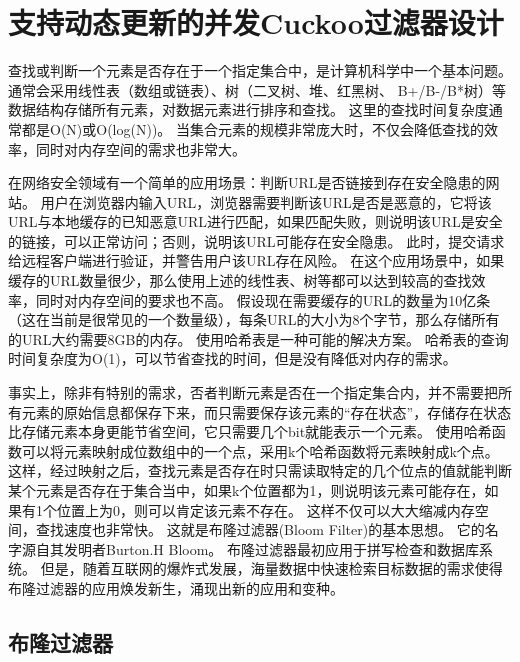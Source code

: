 \chapter{支持动态更新的并发Cuckoo过滤器设计}
查找或判断一个元素是否存在于一个指定集合中，是计算机科学中一个基本问题。
通常会采用线性表（数组或链表）、树（二叉树、堆、红黑树、 B+/B-/B*树）等数据结构存储所有元素，对数据元素进行排序和查找。
这里的查找时间复杂度通常都是O(N)或O(log(N))。
当集合元素的规模非常庞大时，不仅会降低查找的效率，同时对内存空间的需求也非常大。

在网络安全领域有一个简单的应用场景：判断URL是否链接到存在安全隐患的网站。
用户在浏览器内输入URL，浏览器需要判断该URL是否是恶意的，它将该URL与本地缓存的已知恶意URL进行匹配，如果匹配失败，则说明该URL是安全的链接，可以正常访问；否则，说明该URL可能存在安全隐患。
此时，提交请求给远程客户端进行验证，并警告用户该URL存在风险。
在这个应用场景中，如果缓存的URL数量很少，那么使用上述的线性表、树等都可以达到较高的查找效率，同时对内存空间的要求也不高。
假设现在需要缓存的URL的数量为10亿条（这在当前是很常见的一个数量级），每条URL的大小为8个字节，那么存储所有的URL大约需要8GB的内存。
使用哈希表是一种可能的解决方案。
哈希表的查询时间复杂度为O(1)，可以节省查找的时间，但是没有降低对内存的需求。

事实上，除非有特别的需求，否者判断元素是否在一个指定集合内，并不需要把所有元素的原始信息都保存下来，而只需要保存该元素的“存在状态”，存储存在状态比存储元素本身更能节省空间，它只需要几个bit就能表示一个元素。
使用哈希函数可以将元素映射成位数组中的一个点，采用k个哈希函数将元素映射成k个点。
这样，经过映射之后，查找元素是否存在时只需读取特定的几个位点的值就能判断某个元素是否存在于集合当中，如果k个位置都为1，则说明该元素可能存在，如果有1个位置上为0，则可以肯定该元素不存在。
这样不仅可以大大缩减内存空间，查找速度也非常快。
这就是布隆过滤器(Bloom Filter)的基本思想。
它的名字源自其发明者Burton.H Bloom\cite{bloom1970space}。
布隆过滤器最初应用于拼写检查和数据库系统。
但是，随着互联网的爆炸式发展，海量数据中快速检索目标数据的需求使得布隆过滤器的应用焕发新生，涌现出新的应用和变种\cite{song2005fast,bonomi2006improved,yu2009buffalo,bender2012don}。

\section{布隆过滤器}

